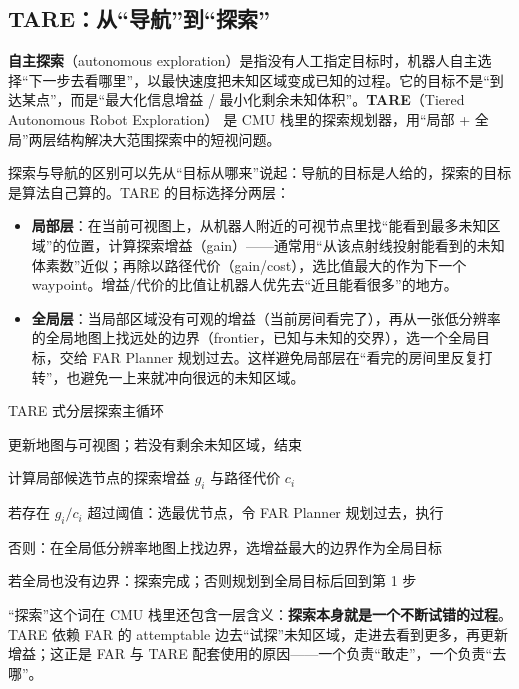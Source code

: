 \subsection{TARE：从“导航”到“探索”}

\begin{definition}
\textbf{自主探索}（autonomous exploration）是指没有人工指定目标时，机器人自主选择“下一步去看哪里”，以最快速度把未知区域变成已知的过程。它的目标不是“到达某点”，而是“最大化信息增益 / 最小化剩余未知体积”。\textbf{TARE}（Tiered Autonomous Robot Exploration）\cite{cao2022tare} 是 CMU 栈里的探索规划器，用“局部 + 全局”两层结构解决大范围探索中的短视问题。
\end{definition}

探索与导航的区别可以先从“目标从哪来”说起：导航的目标是人给的，探索的目标是算法自己算的。TARE 的目标选择分两层：

\begin{itemize}
  \item \textbf{局部层}：在当前可视图上，从机器人附近的可视节点里找“能看到最多未知区域”的位置，计算探索增益（gain）——通常用“从该点射线投射能看到的未知体素数”近似；再除以路径代价（gain/cost），选比值最大的作为下一个 waypoint。增益/代价的比值让机器人优先去“近且能看很多”的地方。
  \item \textbf{全局层}：当局部区域没有可观的增益（当前房间看完了），再从一张低分辨率的全局地图上找远处的边界（frontier，已知与未知的交界），选一个全局目标，交给 FAR Planner 规划过去。这样避免局部层在“看完的房间里反复打转”，也避免一上来就冲向很远的未知区域。
\end{itemize}

\begin{pseudo}{TARE 式分层探索主循环}
  \item 更新地图与可视图；若没有剩余未知区域，结束
  \item 计算局部候选节点的探索增益 $g_i$ 与路径代价 $c_i$
  \item 若存在 $g_i/c_i$ 超过阈值：选最优节点，令 FAR Planner 规划过去，执行
  \item 否则：在全局低分辨率地图上找边界，选增益最大的边界作为全局目标
  \item 若全局也没有边界：探索完成；否则规划到全局目标后回到第 1 步
\end{pseudo}

“探索”这个词在 CMU 栈里还包含一层含义：\textbf{探索本身就是一个不断试错的过程}。TARE 依赖 FAR 的 attemptable 边去“试探”未知区域，走进去看到更多，再更新增益；这正是 FAR 与 TARE 配套使用的原因——一个负责“敢走”，一个负责“去哪”。

